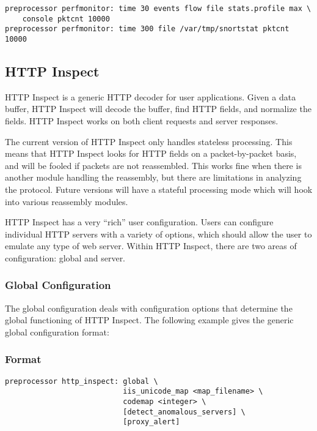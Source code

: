 \documentclass[english]{report}
\begin{document}
\begin{verbatim}
preprocessor perfmonitor: time 30 events flow file stats.profile max \
    console pktcnt 10000 
preprocessor perfmonitor: time 300 file /var/tmp/snortstat pktcnt 10000
\end{verbatim}

\subsection{HTTP Inspect \label{sub:http-inspect}}

HTTP Inspect is a generic HTTP decoder for user applications.  Given a data
buffer, HTTP Inspect will decode the buffer, find HTTP fields, and normalize the
fields.  HTTP Inspect works on both client requests and server responses.

The current version of HTTP Inspect only handles stateless processing.  This
means that HTTP Inspect looks for HTTP fields on a packet-by-packet basis, and
will be fooled if packets are not reassembled.  This works fine when there is
another module handling the reassembly, but there are limitations in analyzing
the protocol.  Future versions will have a stateful processing mode which will
hook into various reassembly modules.

HTTP Inspect has a very ``rich'' user configuration.  Users can configure
individual HTTP servers with a variety of options, which should allow the user
to emulate any type of web server. Within HTTP Inspect, there are two areas of
configuration: global and server.

\subsubsection{Global Configuration}

The global configuration deals with configuration options that determine the
global functioning of HTTP Inspect.  The following example gives the generic
global configuration format:

\subsubsection{Format}
\begin{verbatim}
preprocessor http_inspect: global \
                           iis_unicode_map <map_filename> \
                           codemap <integer> \
                           [detect_anomalous_servers] \
                           [proxy_alert]
\end{verbatim}
\end{document}
